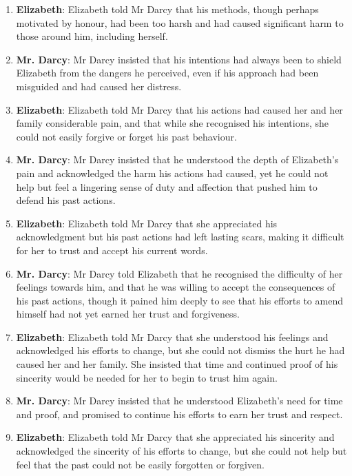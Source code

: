 \documentclass[10pt]{article}
\begin{document}
\begin{enumerate}
\item \textbf{Elizabeth}: Elizabeth told Mr Darcy that his methods, though perhaps motivated by honour, had been too harsh and had caused significant harm to those around him, including herself.

\item \textbf{Mr. Darcy}: Mr Darcy insisted that his intentions had always been to shield Elizabeth from the dangers he perceived, even if his approach had been misguided and had caused her distress.

\item \textbf{Elizabeth}: Elizabeth told Mr Darcy that his actions had caused her and her family considerable pain, and that while she recognised his intentions, she could not easily forgive or forget his past behaviour.

\item \textbf{Mr. Darcy}: Mr Darcy insisted that he understood the depth of Elizabeth's pain and acknowledged the harm his actions had caused, yet he could not help but feel a lingering sense of duty and affection that pushed him to defend his past actions.

\item \textbf{Elizabeth}: Elizabeth told Mr Darcy that she appreciated his acknowledgment but his past actions had left lasting scars, making it difficult for her to trust and accept his current words.

\item \textbf{Mr. Darcy}: Mr Darcy told Elizabeth that he recognised the difficulty of her feelings towards him, and that he was willing to accept the consequences of his past actions, though it pained him deeply to see that his efforts to amend himself had not yet earned her trust and forgiveness.

\item \textbf{Elizabeth}: Elizabeth told Mr Darcy that she understood his feelings and acknowledged his efforts to change, but she could not dismiss the hurt he had caused her and her family. She insisted that time and continued proof of his sincerity would be needed for her to begin to trust him again.

\item \textbf{Mr. Darcy}: Mr Darcy insisted that he understood Elizabeth's need for time and proof, and promised to continue his efforts to earn her trust and respect.

\item \textbf{Elizabeth}: Elizabeth told Mr Darcy that she appreciated his sincerity and acknowledged the sincerity of his efforts to change, but she could not help but feel that the past could not be easily forgotten or forgiven.


\end{enumerate}
\end{document}
